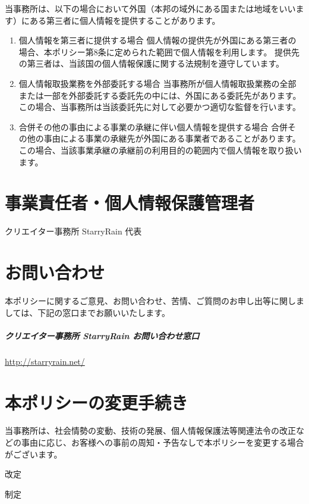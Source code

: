 \documentclass[a4j,titlepage]{ltjsarticle}
\begin{document}
当事務所は、以下の場合において外国（本邦の域外にある国または地域をいいます）にある第三者に個人情報を提供することがあります。
\begin{enumerate}[(1)]
	\item 個人情報を第三者に提供する場合
	      個人情報の提供先が外国にある第三者の場合、本ポリシー第8条に定められた範囲で個人情報を利用します。
	      提供先の第三者は、当該国の個人情報保護に関する法規制を遵守しています。
	\item 個人情報取扱業務を外部委託する場合
	      当事務所が個人情報取扱業務の全部または一部を外部委託する委託先の中には、外国にある委託先があります。この場合、当事務所は当該委託先に対して必要かつ適切な監督を行います。
	\item 合併その他の事由による事業の承継に伴い個人情報を提供する場合
	      合併その他の事由による事業の承継先が外国にある事業者であることがあります。この場合、当該事業承継の承継前の利用目的の範囲内で個人情報を取り扱います。
\end{enumerate}


\section{事業責任者・個人情報保護管理者}
クリエイター事務所 StarryRain 代表

\section{お問い合わせ}
本ポリシーに関するご意見、お問い合わせ、苦情、ご質問のお申し出等に関しましては、下記の窓口までお願いいたします。
\subparagraph{クリエイター事務所 StarryRain お問い合わせ窓口}
\url{http://starryrain.net/}


\section{本ポリシーの変更手続き}
当事務所は、社会情勢の変動、技術の発展、個人情報保護法等関連法令の改正などの事由に応じ、お客様への事前の周知・予告なしで本ポリシーを変更する場合がございます。

\begin{flushright}
	\par \date{\Filemodtoday{\jobname}} 改定
	\par\date{2021年11月27日} 制定
\end{flushright}
\end{document}
